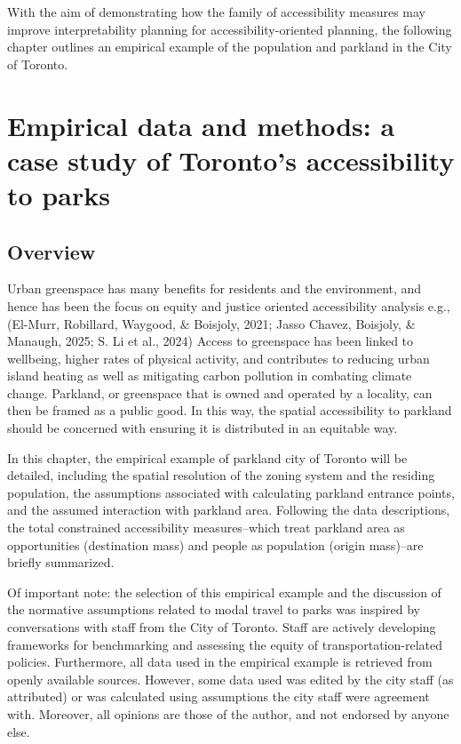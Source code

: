 \documentclass[
11pt, %
oneside, %
english, %
singlespacing, %
]{macthesis} %
\begin{document}
With the aim of demonstrating how the family of accessibility measures may improve interpretability planning for accessibility-oriented planning, the following chapter outlines an empirical example of the population and parkland in the City of Toronto.

\chapter{Empirical data and methods: a case study of Toronto's accessibility to parks}\label{empirical-data-and-methods-a-case-study-of-torontos-accessibility-to-parks}

\section{Overview}\label{overview-2}

Urban greenspace has many benefits for residents and the environment, and hence has been the focus on equity and justice oriented accessibility analysis e.g., (El-Murr, Robillard, Waygood, \& Boisjoly, 2021; Jasso Chavez, Boisjoly, \& Manaugh, 2025; S. Li et al., 2024) Access to greenspace has been linked to wellbeing, higher rates of physical activity, and contributes to reducing urban island heating as well as mitigating carbon pollution in combating climate change. Parkland, or greenspace that is owned and operated by a locality, can then be framed as a public good. In this way, the spatial accessibility to parkland should be concerned with ensuring it is distributed in an equitable way.

In this chapter, the empirical example of parkland city of Toronto will be detailed, including the spatial resolution of the zoning system and the residing population, the assumptions associated with calculating parkland entrance points, and the assumed interaction with parkland area. Following the data descriptions, the total constrained accessibility measures--which treat parkland area as opportunities (destination mass) and people as population (origin mass)--are briefly summarized.

Of important note: the selection of this empirical example and the discussion of the normative assumptions related to modal travel to parks was inspired by conversations with staff from the City of Toronto. Staff are actively developing frameworks for benchmarking and assessing the equity of transportation-related policies. Furthermore, all data used in the empirical example is retrieved from openly available sources. However, some data used was edited by the city staff (as attributed) or was calculated using assumptions the city staff were agreement with. Moreover, all opinions are those of the author, and not endorsed by anyone else.
\end{document}

